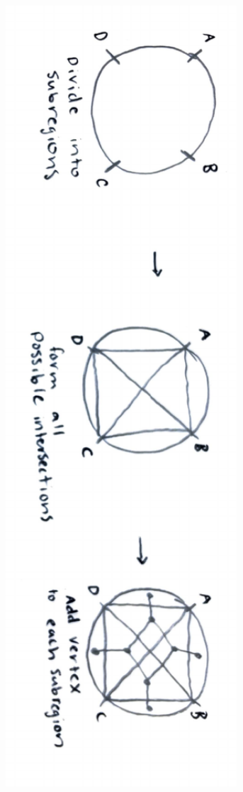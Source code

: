 \documentclass{article}
\begin{document}
\begin{center}
    \includegraphics[width=0.8\textwidth]{subregions.pdf}
\end{center}
\end{document}
